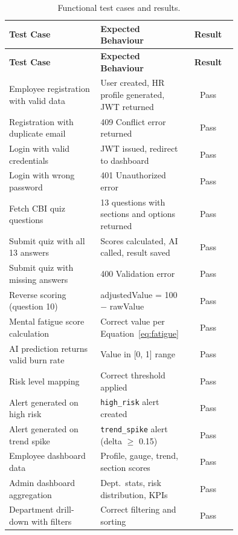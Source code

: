 \documentclass[12pt,a4paper]{article}
\begin{document}
\begin{longtable}{@{}p{0.40\linewidth}p{0.35\linewidth}c@{}}
  \caption{Functional test cases and results.}
  \label{tab:test-cases} \\
  \toprule
  \textbf{Test Case} & \textbf{Expected Behaviour} & \textbf{Result} \\
  \midrule
  \endfirsthead
  \toprule
  \textbf{Test Case} & \textbf{Expected Behaviour} & \textbf{Result} \\
  \midrule
  \endhead
  \bottomrule
  \endfoot

  Employee registration with valid data
    & User created, HR profile generated, JWT returned
    & Pass \\
  Registration with duplicate email
    & 409 Conflict error returned
    & Pass \\
  Login with valid credentials
    & JWT issued, redirect to dashboard
    & Pass \\
  Login with wrong password
    & 401 Unauthorized error
    & Pass \\
  Fetch CBI quiz questions
    & 13 questions with sections and options returned
    & Pass \\
  Submit quiz with all 13 answers
    & Scores calculated, AI called, result saved
    & Pass \\
  Submit quiz with missing answers
    & 400 Validation error
    & Pass \\
  Reverse scoring (question 10)
    & adjustedValue = 100 $-$ rawValue
    & Pass \\
  Mental fatigue score calculation
    & Correct value per Equation~\ref{eq:fatigue}
    & Pass \\
  AI prediction returns valid burn rate
    & Value in [0, 1] range
    & Pass \\
  Risk level mapping
    & Correct threshold applied
    & Pass \\
  Alert generated on high risk
    & \texttt{high\_risk} alert created
    & Pass \\
  Alert generated on trend spike
    & \texttt{trend\_spike} alert (delta $\geq$ 0.15)
    & Pass \\
  Employee dashboard data
    & Profile, gauge, trend, section scores
    & Pass \\
  Admin dashboard aggregation
    & Dept.\ stats, risk distribution, KPIs
    & Pass \\
  Department drill-down with filters
    & Correct filtering and sorting
    & Pass \\

\end{longtable}
\end{document}
